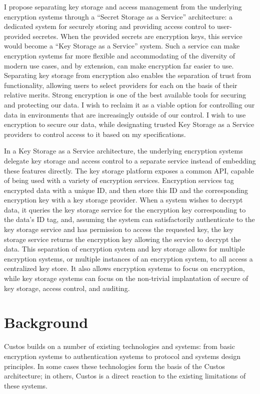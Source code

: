 I propose separating key storage and access management from the
underlying encryption systems through a ``Secret Storage as a
Service'' architecture: a dedicated system for securely storing and
providing access control to user-provided secretes. When the provided
secrets are encryption keys, this service would become a ``Key Storage
as a Service'' system. Such a service can make encryption systems far
more flexible and accommodating of the diversity of modern use cases,
and by extension, can make encryption far easier to use. Separating
key storage from encryption also enables the separation of trust from
functionality, allowing users to select providers for each on the
basis of their relative merits. Strong encryption is one of the best
available tools for securing and protecting our data. I wish to
reclaim it as a viable option for controlling our data in environments
that are increasingly outside of our control. I wish to use encryption
to secure our data, while designating trusted Key Storage as a Service
providers to control access to it based on my specifications.

In a Key Storage as a Service architecture, the underlying encryption
systems delegate key storage and access control to a separate service
instead of embedding these features directly. The key storage platform
exposes a common API, capable of being used with a variety of
encryption services. Encryption services tag encrypted data with a
unique ID, and then store this ID and the corresponding encryption key
with a key storage provider. When a system wishes to decrypt data, it
queries the key storage service for the encryption key corresponding
to the data's ID tag, and, assuming the system can satisfactorily
authenticate to the key storage service and has permission to access
the requested key, the key storage service returns the encryption key
allowing the service to decrypt the data. This separation of
encryption system and key storage allows for multiple encryption
systems, or multiple instances of an encryption system, to all access
a centralized key store. It also allows encryption systems to focus on
encryption, while key storage systems can focus on the non-trivial
implantation of secure of key storage, access control, and auditing.

\section{Background}

Custos builds on a number of existing technologies and systems: from
basic encryption systems to authentication systems to protocol and
systems design principles. In some cases these technologies form the
basis of the Custos architecture; in others, Custos is a direct
reaction to the existing limitations of these systems.

